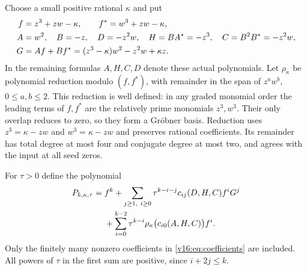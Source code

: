 \documentclass[UTF8,11pt]{ctexart}
\theoremstyle{definition}
\numberwithin{equation}{section}
\begin{document}
Choose a small positive rational $\kappa$ and put
\begin{align}
 f&=z^3+zw-\kappa,\qquad f^*=w^3+zw-\kappa,\notag\\
 A&=w^2,\quad B=-z,\quad D=-z^2w,\quad
 H=B A^*=-z^3,\quad C=B^2B^*=-z^2w,\notag\\
 G&=Af+Bf^*=(z^3-\kappa)w^2-z^2w+\kappa z.
                                      \label{v16:eq:seed}
\end{align}
In the remaining formulas $A,H,C,D$ denote these actual polynomials.
Let $\rho_\kappa$ be polynomial reduction modulo $(f,f^*)$, with
remainder in the span of $z^aw^b$, $0\le a,b\le2$.
This reduction is well defined: in any graded monomial order the
leading terms of $f,f^*$ are the relatively prime monomials $z^3,w^3$.
Their only overlap reduces to zero, so they form a Gr\"obner basis.
Reduction uses $z^3=\kappa-zw$ and $w^3=\kappa-zw$ and preserves
rational coefficients. Its remainder has total degree at most four
and conjugate degree at most two, and agrees with the input at
all seed zeros.

For $\tau>0$ define the polynomial
\begin{align}
 P_{k,\kappa,\tau}
 ={}&f^k+
 \sum_{j\ge1,\ i\ge0}
   \tau^{k-i-j}c_{ij}(D,H,C)f^iG^j\notag\\
 &+\sum_{i=0}^{k-2}
   \tau^{k-i}\rho_\kappa\bigl(c_{i0}(A,H,C)\bigr)f^i.
                                      \label{v16:eq:global}
\end{align}
Only the finitely many nonzero coefficients in
\eqref{v16:eq:coefficients} are included. All powers of $\tau$ in
the first sum are positive, since $i+2j\le k$.
\end{document}
